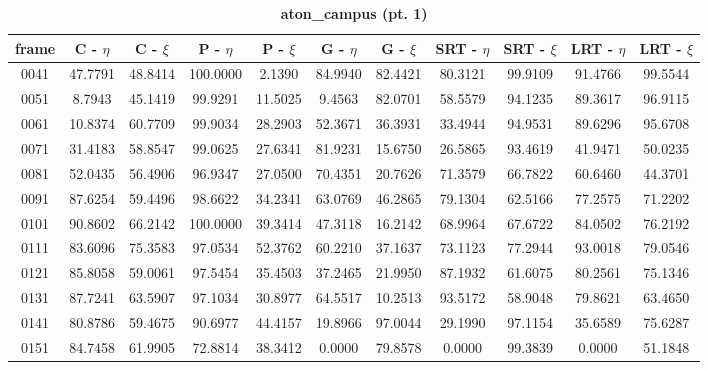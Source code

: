\begin{appendices}
\begin{table}
\centering
\caption{\textbf{aton\_campus (pt. 1)}}
\begin{tabular}{ |c|c|c|c|c|c|c|c|c|c|c| }
	\hline
\textbf{frame} &  \textbf{C - $\eta$} &  \textbf{C - $\xi$} &  \textbf{P - $\eta$} &  \textbf{P - $\xi$} &  \textbf{G - $\eta$} &  \textbf{G - $\xi$} &  \textbf{SRT - $\eta$} &  \textbf{SRT - $\xi$} &  \textbf{LRT - $\eta$} &  \textbf{LRT - $\xi$} \\
\hline
\hline
0041 &  47.7791 &  48.8414 &   100.0000 &  2.1390 &   84.9940 &  82.4421 &   80.3121 &  99.9109 &   91.4766 &  99.5544    \\
\hline
0051 &  8.7943 &  45.1419 &   99.9291 &  11.5025 &   9.4563 &  82.0701 &   58.5579 &  94.1235 &   89.3617 &  96.9115    \\
\hline
0061 &  10.8374 &  60.7709 &   99.9034 &  28.2903 &   52.3671 &  36.3931 &   33.4944 &  94.9531 &   89.6296 &  95.6708    \\
\hline
0071 &  31.4183 &  58.8547 &   99.0625 &  27.6341 &   81.9231 &  15.6750 &   26.5865 &  93.4619 &   41.9471 &  50.0235    \\
\hline
0081 &  52.0435 &  56.4906 &   96.9347 &  27.0500 &   70.4351 &  20.7626 &   71.3579 &  66.7822 &   60.6460 &  44.3701    \\
\hline
0091 &  87.6254 &  59.4496 &   98.6622 &  34.2341 &   63.0769 &  46.2865 &   79.1304 &  62.5166 &   77.2575 &  71.2202    \\
\hline
0101 &  90.8602 &  66.2142 &   100.0000 &  39.3414 &   47.3118 &  16.2142 &   68.9964 &  67.6722 &   84.0502 &  76.2192    \\
\hline
0111 &  83.6096 &  75.3583 &   97.0534 &  52.3762 &   60.2210 &  37.1637 &   73.1123 &  77.2944 &   93.0018 &  79.0546    \\
\hline
0121 &  85.8058 &  59.0061 &   97.5454 &  35.4503 &   37.2465 &  21.9950 &   87.1932 &  61.6075 &   80.2561 &  75.1346    \\
\hline
0131 &  87.7241 &  63.5907 &   97.1034 &  30.8977 &   64.5517 &  10.2513 &   93.5172 &  58.9048 &   79.8621 &  63.4650    \\
\hline
0141 &  80.8786 &  59.4675 &   90.6977 &  44.4157 &   19.8966 &  97.0044 &   29.1990 &  97.1154 &   35.6589 &  75.6287   \\
\hline
0151 &  84.7458 &  61.9905 &   72.8814 &  38.3412 &   0.0000 &  79.8578 &   0.0000 &  99.3839 &   0.0000 &  51.1848   \\


\end{tabular}
\end{table}
\end{appendices}
